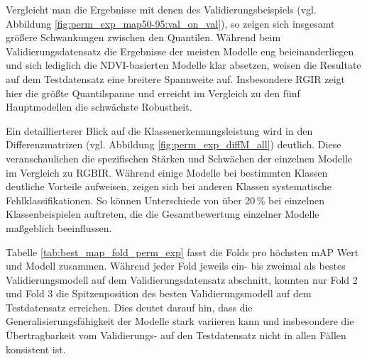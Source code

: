 Vergleicht man die Ergebnisse mit denen des Validierungsbeispiels (vgl. Abbildung \ref{fig:perm_exp_map50-95:val_on_val}), so zeigen sich insgesamt größere Schwankungen zwischen den Quantilen. Während beim Validierungsdatensatz die Ergebnisse der meisten Modelle eng beieinanderliegen und sich lediglich die NDVI-basierten Modelle klar absetzen, weisen die Resultate auf dem Testdatensatz eine breitere Spannweite auf. Insbesondere RGIR zeigt hier die größte Quantilspanne und erreicht im Vergleich zu den fünf Hauptmodellen die schwächste Robustheit.  

Ein detaillierterer Blick auf die Klassenerkennungsleistung wird in den Differenzmatrizen (vgl. Abbildung \ref{fig:perm_exp_diffM_all}) deutlich. Diese veranschaulichen die spezifischen Stärken und Schwächen der einzelnen Modelle im Vergleich zu RGBIR. Während einige Modelle bei bestimmten Klassen deutliche Vorteile aufweisen, zeigen sich bei anderen Klassen systematische Fehlklassifikationen. So können Unterschiede von über 20\,\% bei einzelnen Klassenbeispielen auftreten, die die Gesamtbewertung einzelner Modelle maßgeblich beeinflussen.  

Tabelle \ref{tab:best_map_fold_perm_exp} fasst die Folds pro höchsten \acrshort{mAP} Wert und Modell zusammen. Während jeder Fold jeweils ein- bis zweimal  als bestes Validierungsmodell auf dem Validierungsdatensatz abschnitt, konnten nur Fold 2 und Fold 3 die Spitzenposition des besten Validierungsmodell auf dem Testdatensatz erreichen. Dies deutet darauf hin, dass die Generalisierungsfähigkeit der Modelle stark variieren kann und insbesondere die Übertragbarkeit vom Validierungs- auf den Testdatensatz nicht in allen Fällen konsistent ist.  


